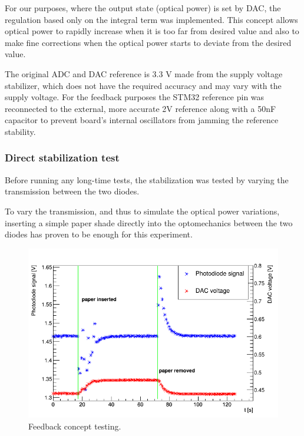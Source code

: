 \par
For our purposes, where the output state (optical power) is set by DAC, the regulation based only on the integral term was implemented. This concept allows optical power to rapidly increase when it is too far from desired value and also to make fine corrections when the optical power starts to deviate from the desired value. 

\par

The original ADC and DAC reference is 3.3 V made from the supply voltage stabilizer, which does not have the required accuracy and may vary with the supply voltage. For the feedback purposes the STM32 reference pin was reconnected to the external, more accurate 2V reference along with a 50nF capacitor to prevent board's internal oscillators from jamming the reference stability.     




\subsubsection{Direct stabilization test}

Before running any long-time tests, the stabilization was tested by varying the transmission between the two diodes.
\par
To vary the transmission, and thus to simulate the optical power variations, inserting a simple paper shade directly into the optomechanics between the two diodes has proven to be enough for this experiment.

\begin{figure}[H]
 \centering
 \includegraphics[scale=0.45]{./pictures/Stabilizin.png}
 \caption{Feedback concept testing.}
 \label{Feedback testing}
\end{figure}

